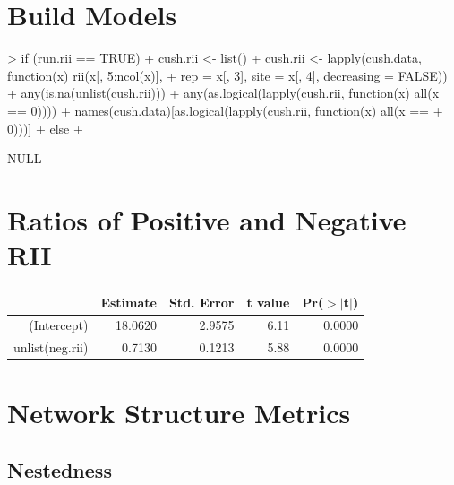\documentclass[12pt]{article}
\begin{document}
\section{Build Models}

\begin{Schunk}
\begin{Sinput}
> if (run.rii == TRUE) {
+     cush.rii <- list()
+     cush.rii <- lapply(cush.data, function(x) rii(x[, 5:ncol(x)], 
+         rep = x[, 3], site = x[, 4], decreasing = FALSE))
+     any(is.na(unlist(cush.rii)))
+     any(as.logical(lapply(cush.rii, function(x) all(x == 0))))
+     names(cush.data)[as.logical(lapply(cush.rii, function(x) all(x == 
+         0)))]
+ } else {
+ }
\end{Sinput}
\begin{Soutput}
NULL
\end{Soutput}
\end{Schunk}


\section{Ratios of Positive and Negative RII}


\begin{table}[ht]
\begin{center}
\begin{tabular}{rrrrr}
  \hline
 & Estimate & Std. Error & t value & Pr($>$$|$t$|$) \\ 
  \hline
(Intercept) & 18.0620 & 2.9575 & 6.11 & 0.0000 \\ 
  unlist(neg.rii) & 0.7130 & 0.1213 & 5.88 & 0.0000 \\ 
   \hline
\end{tabular}
\end{center}
\end{table}
\section{Network Structure Metrics}


\subsection{Nestedness}
\end{document}

